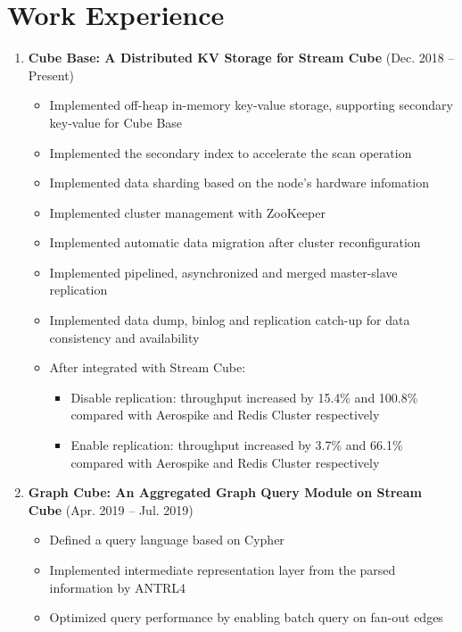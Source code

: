 \documentclass{resume}
\begin{document}
\section{Work Experience}
\begin{enumerate}
  \item \textbf{Cube Base: A Distributed KV Storage for Stream Cube} (Dec. 2018 -- Present)
  \begin{itemize}
    \item Implemented off-heap in-memory key-value storage, supporting secondary key-value for Cube Base
    \item Implemented the secondary index to accelerate the scan operation
    \item Implemented data sharding based on the node's hardware infomation
    \item Implemented cluster management with ZooKeeper
    \item Implemented automatic data migration after cluster reconfiguration
    \item Implemented pipelined, asynchronized and merged master-slave replication
    \item Implemented data dump, binlog and replication catch-up for data consistency and availability
    \item After integrated with Stream Cube:
    \begin{itemize}
      \item Disable replication: throughput increased by 15.4\% and 100.8\% compared with Aerospike and Redis Cluster respectively
      \item Enable replication: throughput increased by 3.7\% and 66.1\% compared with Aerospike and Redis Cluster respectively
    \end{itemize}
  \end{itemize}
  \item \textbf{Graph Cube: An Aggregated Graph Query Module on Stream Cube} (Apr. 2019 -- Jul. 2019)
  \begin{itemize}
    \item Defined a query language based on Cypher
    \item Implemented intermediate representation layer from the parsed information by ANTRL4
    \item Optimized query performance by enabling batch query on fan-out edges
  \end{itemize}

\end{enumerate}
\end{document}
